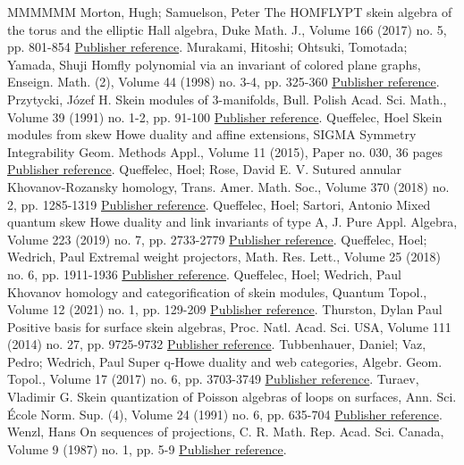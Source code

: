\begin{thebibliography}{MMMMMM}
 Morton, Hugh; Samuelson, Peter The HOMFLYPT skein algebra of the torus and the elliptic Hall algebra, Duke Math. J., Volume 166 (2017) no. 5, pp. 801-854 \href{https://alco.centre-mersenne.org/articles/10.5802/alco.330/#MS}{Publisher reference}.
 Murakami, Hitoshi; Ohtsuki, Tomotada; Yamada, Shuji Homfly polynomial via an invariant of colored plane graphs, Enseign. Math. (2), Volume 44 (1998) no. 3-4, pp. 325-360 \href{https://alco.centre-mersenne.org/articles/10.5802/alco.330/#MOY}{Publisher reference}.
 Przytycki, Józef H. Skein modules of 3-manifolds, Bull. Polish Acad. Sci. Math., Volume 39 (1991) no. 1-2, pp. 91-100 \href{https://alco.centre-mersenne.org/articles/10.5802/alco.330/#Prz1}{Publisher reference}.
 Queffelec, Hoel Skein modules from skew Howe duality and affine extensions, SIGMA Symmetry Integrability Geom. Methods Appl., Volume 11 (2015), Paper no. 030, 36 pages \href{https://alco.centre-mersenne.org/articles/10.5802/alco.330/#Queff_aff}{Publisher reference}.
 Queffelec, Hoel; Rose, David E. V. Sutured annular Khovanov-Rozansky homology, Trans. Amer. Math. Soc., Volume 370 (2018) no. 2, pp. 1285-1319 \href{https://alco.centre-mersenne.org/articles/10.5802/alco.330/#QR2}{Publisher reference}.
 Queffelec, Hoel; Sartori, Antonio Mixed quantum skew Howe duality and link invariants of type A, J. Pure Appl. Algebra, Volume 223 (2019) no. 7, pp. 2733-2779 \href{https://alco.centre-mersenne.org/articles/10.5802/alco.330/#QS2}{Publisher reference}.
 Queffelec, Hoel; Wedrich, Paul Extremal weight projectors, Math. Res. Lett., Volume 25 (2018) no. 6, pp. 1911-1936 \href{https://alco.centre-mersenne.org/articles/10.5802/alco.330/#QW}{Publisher reference}.
 Queffelec, Hoel; Wedrich, Paul Khovanov homology and categorification of skein modules, Quantum Topol., Volume 12 (2021) no. 1, pp. 129-209 \href{https://alco.centre-mersenne.org/articles/10.5802/alco.330/#QW3}{Publisher reference}.
 Thurston, Dylan Paul Positive basis for surface skein algebras, Proc. Natl. Acad. Sci. USA, Volume 111 (2014) no. 27, pp. 9725-9732 \href{https://alco.centre-mersenne.org/articles/10.5802/alco.330/#Thu}{Publisher reference}.
 Tubbenhauer, Daniel; Vaz, Pedro; Wedrich, Paul Super q-Howe duality and web categories, Algebr. Geom. Topol., Volume 17 (2017) no. 6, pp. 3703-3749 \href{https://alco.centre-mersenne.org/articles/10.5802/alco.330/#TVW}{Publisher reference}.
 Turaev, Vladimir G. Skein quantization of Poisson algebras of loops on surfaces, Ann. Sci. École Norm. Sup. (4), Volume 24 (1991) no. 6, pp. 635-704 \href{https://alco.centre-mersenne.org/articles/10.5802/alco.330/#Tur}{Publisher reference}.
 Wenzl, Hans On sequences of projections, C. R. Math. Rep. Acad. Sci. Canada, Volume 9 (1987) no. 1, pp. 5-9 \href{https://alco.centre-mersenne.org/articles/10.5802/alco.330/#Wen}{Publisher reference}.
\end{thebibliography}
